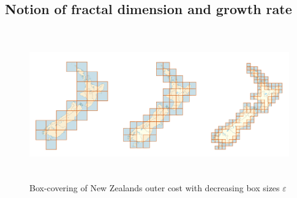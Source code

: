 \documentclass[12pt,a4paper]{scrartcl}
\newcommand{\1}{\mathbbm{1}}
\theoremstyle{definition}
\numberwithin{equation}{section}
\begin{document}
\subsection{Notion of fractal dimension and growth rate} \label{notion}

\begin{figure}
	\centering
	\includegraphics[height=6.5cm]{images/geogebra-images/neuseeland-squares.png}
	\caption{Box-covering of New Zealands outer cost with decreasing box sizes $\varepsilon$} \label{neuseeland}
\end{figure}
\end{document}
